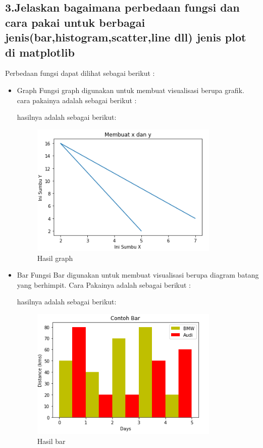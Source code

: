 \subsection{3.Jelaskan bagaimana perbedaan fungsi dan cara pakai untuk berbagai jenis(bar,histogram,scatter,line dll) jenis plot di matplotlib}
Perbedaan fungsi dapat dilihat sebagai berikut :
\begin{itemize}
\item Graph\linebreak
Fungsi graph digunakan untuk membuat visualisasi berupa grafik.
cara pakainya adalah sebagai berikut :

hasilnya adalah sebagai berikut:
\begin{figure}[H]
\includegraphics[width=9cm]{figures/6/Teori/1174005/3graph.png}
\caption{Hasil graph}
\centering
\end{figure}

\item Bar\linebreak 
Fungsi Bar digunakan untuk membuat visualisasi berupa diagram batang yang berhimpit.
Cara Pakainya adalah sebagai berikut :

hasilnya adalah sebagai berikut:
\begin{figure}[H]
\includegraphics[width=9cm]{figures/6/Teori/1174005/3bar.png}
\caption{Hasil bar}
\centering
\end{figure}


\end{itemize}
